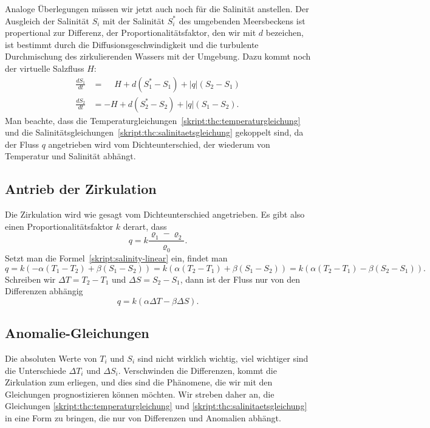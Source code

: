 Analoge Überlegungen müssen wir jetzt auch noch für die Salinität anstellen.
Der Ausgleich der Salinität $S_i$ mit der Salinität $S_i^*$ des
umgebenden Meersbeckens ist propertional zur Differenz, der
Proportionalitätsfaktor, den wir mit $d$ bezeichen, ist bestimmt durch
die Diffusionsgeschwindigkeit und die turbulente Durchmischung des
zirkulierenden Wassers mit der Umgebung.
Dazu kommt noch der virtuelle Salzfluss $H$:
\begin{equation}
\begin{aligned}
\frac{dS_1}{dt}
&=
\phantom{-}
H
+
d(S_1^*-S_1)
+
|q|(S_2-S_1)
\\
\frac{dS_2}{dt}
&=
-H
+
d(S_2^*-S_2)
+
|q|(S_1-S_2).
\end{aligned}
\label{skript:thc:salinitaetsgleichung}
\end{equation}
Man beachte, dass die Temperaturgleichungen~\ref{skript:thc:temperaturgleichung}
und die Salinitätsgleichungen~\ref{skript:thc:salinitaetsgleichung} 
gekoppelt sind, da der Fluss $q$ angetrieben wird vom Dichteunterschied,
der wiederum von Temperatur und Salinität abhängt.

\subsection{Antrieb der Zirkulation}
Die Zirkulation wird wie gesagt vom Dichteunterschied angetrieben.
Es gibt also einen Proportionalitätsfaktor $k$ derart, dass
\[
q = k\frac{\varrho_1 - \varrho_2}{\varrho_0}.
\]
Setzt man die Formel~\ref{skript:salinity-linear} ein, findet man
\[
q
=
k(-\alpha(T_1-T_2) + \beta(S_1-S_2))
=
k(\alpha(T_2-T_1) + \beta(S_1-S_2))
=
k(\alpha(T_2-T_1) - \beta(S_2-S_1)).
\]
Schreiben wir $\Delta T = T_2-T_1$ und $\Delta S=S_2-S_1$,
dann ist der Fluss nur von den Differenzen abhängig
\begin{equation}
q=k(\alpha\Delta T-\beta\Delta S).
\label{skript:thc:fluss-delta}
\end{equation}

\subsection{Anomalie-Gleichungen}
Die absoluten Werte von $T_i$ und $S_i$ sind nicht wirklich wichtig,
viel wichtiger sind die Unterschiede $\Delta T_i$ und $\Delta S_i$.
Verschwinden die Differenzen, kommt die Zirkulation zum erliegen,
und dies sind die Phänomene, die wir mit den Gleichungen prognostizieren
können möchten.
Wir streben daher an, die Gleichungen
\eqref{skript:thc:temperaturgleichung}
und
\eqref{skript:thc:salinitaetsgleichung}
in eine Form zu bringen, die nur von Differenzen und Anomalien
abhängt.

